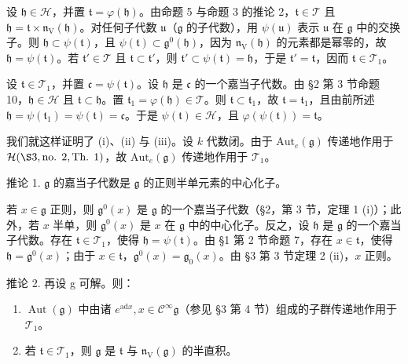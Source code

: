 设 \(\mathfrak{h} \in \mathcal{H}\)，并置 \(\mathfrak{t} = \varphi(\mathfrak{h})\)。由命题 5 与命题 3 的推论 2，\(\mathfrak{t} \in \mathcal{T}\) 且 \(\mathfrak{h} = \mathfrak{t} \times \mathfrak{n}_{\mathrm{V}}(\mathfrak{h})\)。对任何子代数 \(\mathfrak{u}\)（\(\mathfrak{g}\) 的子代数），用 \(\psi(\mathfrak{u})\) 表示 \(\mathfrak{u}\) 在 \(\mathfrak{g}\) 中的交换子。则 \(\mathfrak{h} \subset \psi(\mathfrak{t})\)，且 \(\psi(\mathfrak{t}) \subset \mathfrak{g}^0(\mathfrak{h})\)，因为 \(\mathfrak{n}_{\mathrm{V}}(\mathfrak{h})\) 的元素都是幂零的，故 \(\mathfrak{h} = \psi(\mathfrak{t})\)。若 \(\mathfrak{t}' \in \mathcal{T}\) 且 \(\mathfrak{t} \subset \mathfrak{t}'\)，则 \(\mathfrak{t}' \subset \psi(\mathfrak{t}) = \mathfrak{h}\)，于是 \(\mathfrak{t}' = \mathfrak{t}\)，因而 \(\mathfrak{t} \in \mathcal{T}_1\)。

设 \(\mathfrak{t} \in \mathcal{T}_1\)，并置 \(\mathfrak{c} = \psi(\mathfrak{t})\)。设 \(\mathfrak{h}\) 是 \(\mathfrak{c}\) 的一个嘉当子代数。由 §2 第 3 节命题 10，\(\mathfrak{h} \in \mathcal{H}\) 且 \(\mathfrak{t} \subset \mathfrak{h}\)。置 \(\mathfrak{t}_1 = \varphi(\mathfrak{h}) \in \mathcal{T}\)。则 \(\mathfrak{t} \subset \mathfrak{t}_1\)，故 \(\mathfrak{t} = \mathfrak{t}_1\)，且由前所述 \(\mathfrak{h} = \psi(\mathfrak{t}_1) = \psi(\mathfrak{t}) = \mathfrak{c}\)。于是 \(\psi(\mathfrak{t}) \in \mathcal{H}\)，且 \(\varphi(\psi(\mathfrak{t})) = \mathfrak{t}\)。

我们就这样证明了 (i)、(ii) 与 (iii)。设 \(k\) 代数闭。由于 \(\mathrm{Aut}_e(\mathfrak{g})\) 传递地作用于 \(\mathcal{H}(\S 3, \text{no. } 2, \text{Th. } 1)\)，故 \(\mathrm{Aut}_e(\mathfrak{g})\) 传递地作用于 \(\mathcal{T}_1\)。

推论 1. \(\mathfrak{g}\) 的嘉当子代数是 \(\mathfrak{g}\) 的正则半单元素的中心化子。

若 \(x \in \mathfrak{g}\) 正则，则 \(\mathfrak{g}^0(x)\) 是 \(\mathfrak{g}\) 的一个嘉当子代数（§2，第 3 节，定理 1 (i)）；此外，若 \(x\) 半单，则 \(\mathfrak{g}^0(x)\) 是 \(x\) 在 \(\mathfrak{g}\) 中的中心化子。反之，设 \(\mathfrak{h}\) 是 \(\mathfrak{g}\) 的一个嘉当子代数。存在 \(\mathfrak{t} \in \mathcal{T}_1\)，使得 \(\mathfrak{h} = \psi(\mathfrak{t})\)。由 §1 第 2 节命题 7，存在 \(x \in \mathfrak{t}\)，使得 \(\mathfrak{h} = \mathfrak{g}^0(x)\)；由于 \(x \in \mathfrak{t}\)，\(\mathfrak{g}^0(x) = \mathfrak{g}_0(x)\)。由 §3 第 3 节定理 2 (ii)，\(x\) 正则。

推论 2. 再设 g 可解。则：

\begin{enumerate}
\def\labelenumi{(\roman{enumi})}
\item
  \(\operatorname{Aut}(\mathfrak{g})\) 中由诸 \(e^{\mathrm{ad}x}, x \in \mathcal{C}^{\infty}\mathfrak{g}\)（参见 §3 第 4 节）组成的子群传递地作用于 \(\mathcal{T}_1\)。
\item
  若 \(\mathfrak{t} \in \mathcal{T}_1\)，则 \(\mathfrak{g}\) 是 \(\mathfrak{t}\) 与 \(\mathfrak{n}_{\mathrm{V}}(\mathfrak{g})\) 的半直积。
\end{enumerate}


